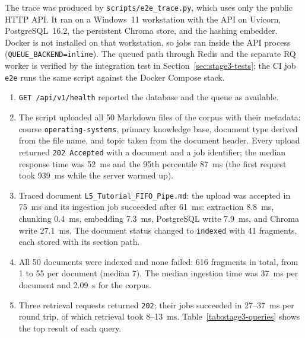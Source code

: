 \documentclass[12pt,a4paper]{article}
\begin{document}
The trace was produced by \texttt{scripts/e2e\_trace.py}, which uses
only the public HTTP API. It ran on a Windows~11 workstation with the
API on Uvicorn, PostgreSQL~16.2, the persistent Chroma store, and the
hashing embedder. Docker is not installed on that workstation, so jobs
ran inside the API process (\texttt{QUEUE\_BACKEND=inline}). The queued
path through Redis and the separate RQ worker is verified by the
integration test in Section~\ref{sec:stage3-tests}; the CI job
\texttt{e2e} runs the same script against the Docker Compose stack.

\begin{enumerate}
    \item \texttt{GET /api/v1/health} reported the database and the
    queue as available.

    \item The script uploaded all 50 Markdown files of the corpus with
    their metadata: course \texttt{operating-systems}, primary knowledge
    base, document type derived from the file name, and topic taken
    from the document header. Every upload returned
    \texttt{202 Accepted} with a document and a job identifier; the
    median response time was 52~ms and the 95th percentile 87~ms (the
    first request took 939~ms while the server warmed up).

    \item Traced document \texttt{L5\_Tutorial\_FIFO\_Pipe.md}: the
    upload was accepted in 75~ms and its ingestion job succeeded after
    61~ms: extraction 8.8~ms, chunking 0.4~ms, embedding 7.3~ms,
    PostgreSQL write 7.9~ms, and Chroma write 27.1~ms. The document
    status changed to \texttt{indexed} with 41 fragments, each stored
    with its section path.

    \item All 50 documents were indexed and none failed: 616 fragments
    in total, from 1 to 55 per document (median 7). The median
    ingestion time was 37~ms per document and 2.09~s for the corpus.

    \item Three retrieval requests returned \texttt{202}; their jobs
    succeeded in 27--37~ms per round trip, of which retrieval took
    8--13~ms. Table~\ref{tab:stage3-queries} shows the top result of
    each query.
\end{enumerate}
\end{document}
